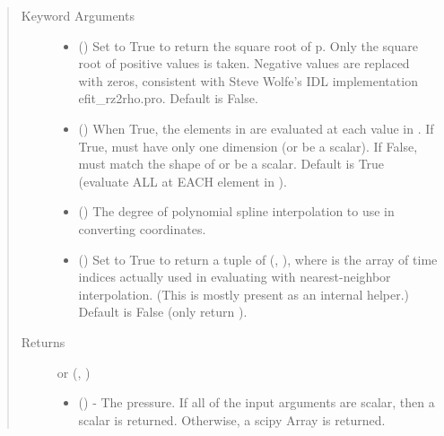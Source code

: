 \documentclass[letterpaper,10pt,english]{sphinxmanual}
\begin{document}
\begin{fulllineitems}
\begin{fulllineitems}
\begin{quote}
\begin{description}
\begin{itemize}
\end{itemize}

\item[{Keyword Arguments}] \leavevmode\begin{itemize}
\item {} 
 () \textendash{} Set to True to return the square root of p.
Only the square root of positive values is taken. Negative
values are replaced with zeros, consistent with Steve Wolfe’s
IDL implementation efit\_rz2rho.pro. Default is False.

\item {} 
 () \textendash{} When True, the elements in  are evaluated
at each value in . If True,  must have only one dimension
(or be a scalar). If False,  must match the shape of 
or be a scalar. Default is True (evaluate ALL  at EACH
element in ).

\item {} 
 () \textendash{} The degree of polynomial spline interpolation to
use in converting coordinates.

\item {} 
 () \textendash{} Set to True to return a tuple of (,
), where  is the array of time indices
actually used in evaluating  with nearest-neighbor
interpolation. (This is mostly present as an internal helper.)
Default is False (only return ).

\end{itemize}

\item[{Returns}] \leavevmode

 or (, )
\begin{itemize}
\item {} 
 () - The pressure. If
all of the input arguments are scalar, then a scalar is returned.
Otherwise, a scipy Array is returned.


\end{itemize}
\end{description}
\end{quote}
\end{fulllineitems}
\end{fulllineitems}
\end{document}
